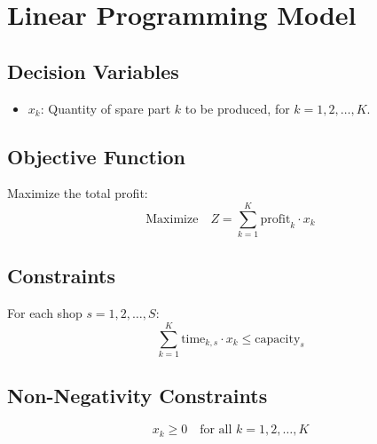 \documentclass{article}
\begin{document}
\section*{Linear Programming Model}

\subsection*{Decision Variables}
\begin{itemize}
    \item \( x_k \): Quantity of spare part \( k \) to be produced, for \( k = 1, 2, \ldots, K \).
\end{itemize}

\subsection*{Objective Function}
Maximize the total profit:
\[
\text{Maximize} \quad Z = \sum_{k=1}^{K} \text{profit}_{k} \cdot x_k
\]

\subsection*{Constraints}
For each shop \( s = 1, 2, \ldots, S \):
\[
\sum_{k=1}^{K} \text{time}_{k, s} \cdot x_k \leq \text{capacity}_{s}
\]

\subsection*{Non-Negativity Constraints}
\[
x_k \geq 0 \quad \text{for all } k = 1, 2, \ldots, K
\]
\end{document}
